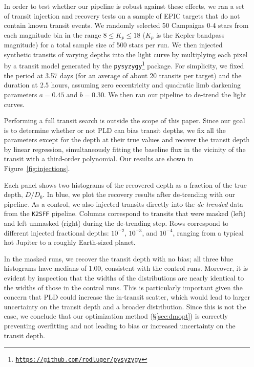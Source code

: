 \documentclass[]{emulateapj}
\newcommand{\note}[1]{{\color{red} #1}}
\begin{document}
In order to test whether our pipeline is robust against these effects, we ran a set
of transit injection and recovery tests on a sample of EPIC
targets that do not contain known transit events. We randomly selected 50 Campaigns 0-4 stars 
from each magnitude bin in the range $8 \le K_p \le 18$ ($K_p$ is the Kepler bandpass magnitude)
for a total sample size of 500 stars per run. We then injected synthetic transits of varying depths into the
light curve by multiplying each pixel by a transit model generated by the 
\texttt{pysyzygy}\footnote{\texttt{\url{https://github.com/rodluger/pysyzygy}}}
package. For simplicity, we fixed the period at 3.57 days (for an average of about
20 transits per target) and the duration at 2.5 hours, assuming zero eccentricity
and quadratic limb darkening parameters $a = 0.45$ and $b = 0.30$. We then
ran our pipeline to de-trend the light curves.

Performing a full transit search is outside the scope of this paper. Since our 
goal is to determine whether or not PLD can bias transit depths, we fix all the
parameters except for the depth at their true values and recover the transit
depth by linear regression, simultaneously fitting the baseline flux in the
vicinity of the transit with a third-order polynomial. Our results are shown
in Figure~\ref{fig:injections}.

Each panel shows two histograms of the recovered depth as a fraction of the true
depth, $D/D_0$. In blue, we plot the recovery results after de-trending with our pipeline.
As a control, we also injected transits directly into the \emph{de-trended} data from
the \texttt{K2SFF} pipeline. \note{Columns correspond to transits that were masked (left) and
left unmasked (right) during the de-trending step.} Rows correspond to different
injected fractional depths: $10^{-2}$, $10^{-3}$, and $10^{-4}$, ranging from a typical 
hot Jupiter to a roughly Earth-sized planet.

\note{In the masked runs, we recover the transit depth with no bias; all three blue histograms
have medians of 1.00, consistent with the control runs. Moreover, 
it is evident by inspection that the widths of the distributions are nearly identical
to the widths of those in the control runs. This is particularly important given the
concern that PLD could increase the in-transit scatter, which would lead to larger
uncertainty on the transit depth and a broader distribution. Since this is not the case,
we conclude that our optimization method (\S\ref{sec:dmopt}) is correctly preventing 
overfitting and not leading to bias or increased uncertainty on the transit depth.}
\end{document}
